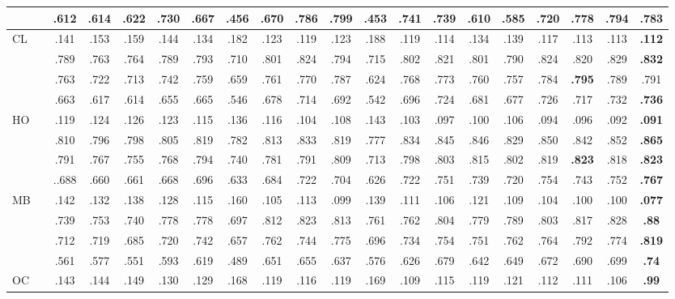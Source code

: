 \documentclass[lettersize,journal]{IEEEtran}
\begin{document}
\begin{table*}
\begin{tabular}{l|r|ccccccccccccccccc|c}
						&  & .612 & .614 & .622 & .730 & .667 & .456 & .670 & .786 & .799 & .453 & .741 & .739 & .610 & .585 & .720 & .778 & \textbf{.794} & {.783} \\
	\hline \multirow{4}{*}{CL} &  & .141 & .153 & .159 & .144 & .134 & .182 & .123 & .119 & .123 & .188 & .119 & .114 & .134 & .139 & .117 & .113 & .113 & \textbf{.112} \\
						&   & .789 & .763 & .764 & .789 & .793 & .710 & .801 & .824 & .794 & .715 & .802 & .821 & .801 & .790 & .824 & .820 & .829 & \textbf{.832} \\
						&  & .763 & .722 & .713 & .742 & .759 & .659 & .761 & .770 & .787 & .624 & .768 & .773 & .760 & .757 & .784 & \textbf{.795} & .789 & {.791} \\
						&  & .663 & .617 & .614 & .655 & .665 & .546 & .678 & .714 & .692 & .542 & .696 & .724 & .681 & .677 & .726 & .717 & .732 & \textbf{.736} \\
	\hline \multirow{4}{*}{HO} &  & .119 & .124 & .126 & .123 & .115 & .136 & .116 & .104 & .108 & .143 & .103 & .097 & .100 & .106 & .094 & .096 & .092 & \textbf{.091} \\
						&   &.810 & .796 & .798 & .805 & .819 & .782 & .813 & .833 & .819 & .777 & .834 & .845 & .846 & .829 & .850 & .842 & .852 & \textbf{.865} \\
						&  & .791 & .767 & .755 & .768 & .794 & .740 & .781 & .791 & .809 & .713 & .798 & .803 & .815 & .802 & .819 & \textbf{.823} & .818 & \textbf{.823} \\
						&  & ..688 & .660 & .661 & .668 & .696 & .633 & .684 & .722 & .704 & .626 & .722 & .751 & .739 & .720 & .754 & .743 & .752 & \textbf{.767} \\
	\hline \multirow{4}{*}{MB} &  & .142 & .132 & .138 & .128 & .115 & .160 & .105 & .113 & .099 & .139 & .111 & .106 & .121 & .109 & .104 & .100 & .100 & \textbf{.077} \\
						&   & .739 & .753 & .740 & .778 & .778 & .697 & .812 & .823 & .813 & .761 & .762 & .804 & .779 & .789 & .803 & .817 & .828 & \textbf{.88} \\
						&  & .712 & .719 & .685 & .720 & .742 & .657 & .762 & .744 & .775 & .696 & .734 & .754 & .751 & .762 & .764 & .792 & .774 & \textbf{.819} \\
						&  & .561 & .577 & .551 & .593 & .619 & .489 & .651 & .655 & .637 & .576 & .626 & .679 & .642 & .649 & .672 & .690 & .699 & \textbf{.74} \\
	\hline \multirow{4}{*}{OC} &  & .143 & .144 & .149 & .130 & .129 & .168 & .119 & .116 & .119 & .169 & .109 & .115 & .119 & .121 & .112 & .111 & .106 & \textbf{.99} \\

\end{tabular}
\end{table*}
\end{document}
